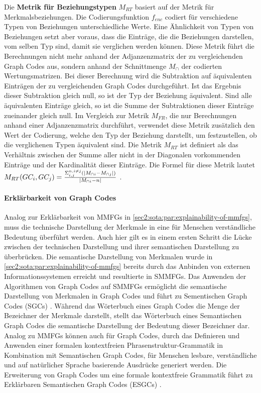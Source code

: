 Die \textbf{Metrik für Beziehungstypen} $M_{RT}$ basiert auf der Metrik für Merkmalsbeziehungen.
Die Codierungsfunktion $f_{enc}$ codiert für verschiedene Typen von Beziehungen unterschiedliche Werte.
Eine Ähnlichkeit von Typen von Beziehungen setzt aber voraus, dass die Einträge, die die Beziehungen darstellen, vom selben Typ sind, damit sie verglichen werden können.
Diese Metrik führt die Berechnungen nicht mehr anhand der Adjanzenzmatrix der zu vergleichenden Graph Codes aus, sondern anhand der Schnittmenge $M_{\cap}$ der codierten Wertungsmatrizen.
Bei dieser Berechnung wird die Subtraktion auf äquivalenten Einträgen der zu vergleichenden Graph Codes durchgeführt.
Ist das Ergebnis dieser Subtraktion gleich null, so ist der Typ der Beziehung äquivalent.
Sind alle äquivalenten Einträge gleich, so ist die Summe der Subtraktionen dieser Einträge zueinander gleich null.
Im Vergleich zur Metrik $M_{FR}$, die nur Berechnungen anhand einer Adjanzenzmatrix durchführt, verwendet diese Metrik zusätzlich den Wert der Codierung, welche den Typ der Beziehung darstellt, um festzustellen, ob die verglichenen Typen äquivalent sind.
Die Metrik $M_{RT}$ ist definiert als das Verhältnis zwischen der Summe aller nicht in der Diagonalen vorkommenden Einträge und der Kardinalität dieser Einträge.
Die Formel für diese Metrik lautet $M_{RT}(GC_i,GC_j) = \frac{\Sigma^{n,i \neq j}_{i,j}(\abs{M_{\cap i} - M_{\cap j}})}{\abs{M_{\cap i} - n}}$ \cite{gc-2d-proj-mmfg}.

\paragraph{Erklärbarkeit von Graph Codes}
Analog zur Erklärbarkeit von MMFGs in \cref{sec2:sota:par:explainability-of-mmfgs}, muss die technische Darstellung der Merkmale in eine für Menschen verständliche Bedeutung überführt werden.
Auch hier gilt es in einem ersten Schritt die Lücke zwischen der technischen Darstellung und ihrer semantischen Darstellung zu überbrücken.
Die semantische Darstellung von Merkmalen wurde in \cref{sec2:sota:par:explainability-of-mmfgs} bereits durch das Anbinden von externen Informationssystemen erreicht und resultierte in SMMFGs.
Das Anwenden der Algorithmen von Graph Codes auf SMMFGs ermöglicht die semantische Darstellung von Merkmalen in Graph Codes und führt zu Sementischen Graph Codes (SGCs) \cite{towards_auto_sem_expl_mmfg}.
Während das Wörterbuch eines Graph Codes die Menge der Bezeichner der Merkmale darstellt, stellt das Wörterbuch eines Semantischen Graph Codes die semantische Darstellung der Bedeutung dieser Bezeichner dar.
Analog zu MMFGs können auch für Graph Codes, durch das Definieren und Anwenden einer formalen kontextfreien Phrasenstruktur-Grammatik in Kombination mit Semantischen Graph Codes, für Menschen lesbare, verständliche und auf natürlicher Sprache basierende Ausdrücke generiert werden.
Die Erweiterung von Graph Codes um eine formale kontextfreie Grammatik führt zu Erklärbaren Semantischen Graph Codes (ESGCs) \cite{exp-mmfg}.

